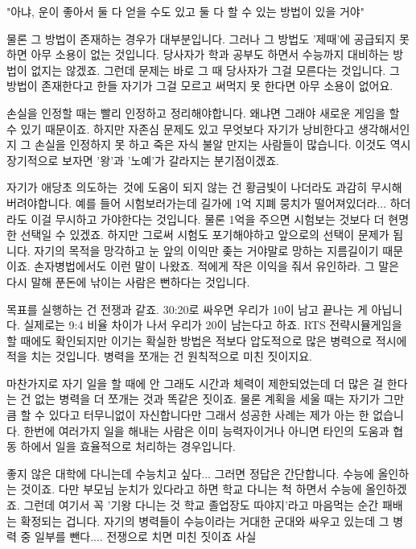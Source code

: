 "아냐, 운이 좋아서 둘 다 얻을 수도 있고 둘 다 할 수 있는 방법이 있을 거야"
\vspace{5mm}

물론 그 방법이 존재하는 경우가 대부분입니다. 그러나 그 방법도 '제때'에 공급되지 못 하면 아무 소용이 없는 것입니다.
당사자가 학과 공부도 하면서 수능까지 대비하는 방법이 없지는 않겠죠. 그런데 문제는 바로 그 때 당사자가 그걸 모른다는 것입니다.
그 방법이 존재한다고 한들 자기가 그걸 모르고 써먹지 못 한다면 아무 소용이 없어요.
\vspace{5mm}

손실을 인정할 때는 빨리 인정하고 정리해야합니다. 왜냐면 그래야 새로운 게임을 할 수 있기 때문이죠.
하지만 자존심 문제도 있고 무엇보다 자기가 낭비한다고 생각해서인지 그 손실을 인정하지 못 하고 죽은 자식 불알 만지는 사람들이 많습니다.
이것도 역시 장기적으로 보자면 '왕'과 '노예'가 갈라지는 분기점이겠죠.
\vspace{5mm}

자기가 애당초 의도하는 것에 도움이 되지 않는 건 황금빛이 나더라도 과감히 무시해버려야합니다.
예를 들어 시험보러가는데 길가에 1억 지폐 뭉치가 떨어져있더라... 하더라도 이걸 무시하고 가야한다는 것입니다.
물론 1억을 주으면 시험보는 것보다 더 현명한 선택일 수 있겠죠. 하지만 그로써 시험도 포기해야하고 앞으로의 선택이 문제가 됩니다.
자기의 목적을 망각하고 눈 앞의 이익만 좆는 거야말로 망하는 지름길이기 때문이죠.
손자병법에서도 이런 말이 나왔죠. 적에게 작은 이익을 줘서 유인하라.
그 말은 다시 말해 푼돈에 낚이는 사람은 뻔하다는 것입니다.
\vspace{5mm}

목표를 실행하는 건 전쟁과 같죠. 30:20로 싸우면 우리가 10이 남고 끝나는 게 아닙니다. 실제로는 9:4 비율 차이가 나서 우리가 20이 남는다고 하죠.
RTS 전략시뮬게임을 할 때에도 확인되지만 이기는 확실한 방법은 적보다 압도적으로 많은 병력으로 적시에 적을 치는 것입니다.
병력을 쪼개는 건 원칙적으로 미친 짓이지요.
\vspace{5mm}

마찬가지로 자기 일을 할 때에 안 그래도 시간과 체력이 제한되었는데 더 많은 걸 한다는 건 없는 병력을 더 쪼개는 것과 똑같은 짓이죠.
물론 계획을 세울 때는 자기가 그만큼 할 수 있다고 터무니없이 자신합니다만 그래서 성공한 사례는 제가 아는 한 없습니다.
한번에 여러가지 일을 해내는 사람은 이미 능력자이거나 아니면 타인의 도움과 협동 하에서 일을 효율적으로 처리하는 경우입니다.
\vspace{5mm}

좋지 않은 대학에 다니는데 수능치고 싶다... 그러면 정답은 간단합니다. 수능에 올인하는 것이죠.
다만 부모님 눈치가 있다라고 하면 학교 다니는 척 하면서 수능에 올인하겠죠.
그런데 여기서 꼭 '기왕 다니는 것 학교 졸업장도 따야지'라고 마음먹는 순간 패배는 확정되는 겁니다.
자기의 병력들이 수능이라는 거대한 군대와 싸우고 있는데 그 병력 중 일부를 뺀다.... 전쟁으로 치면 미친 짓이죠 사실
\vspace{5mm}







